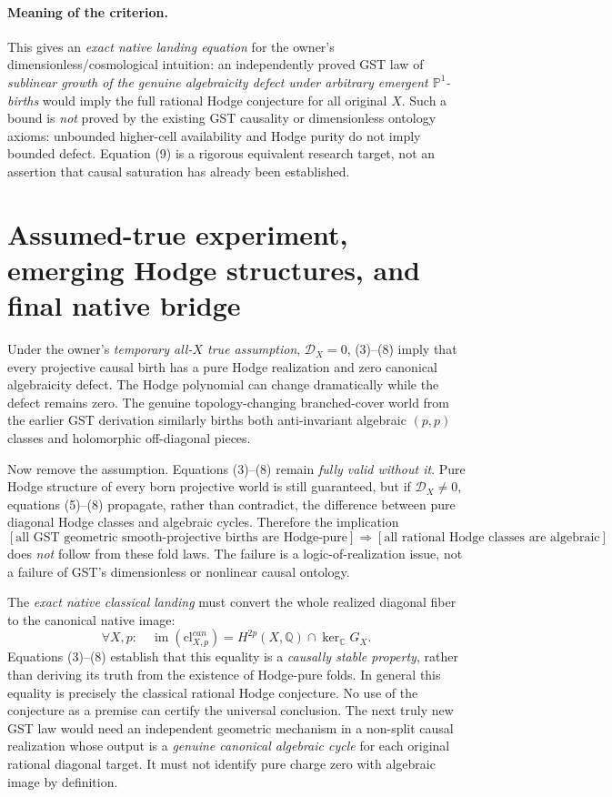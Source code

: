\documentclass[11pt]{article}
\begin{document}
\paragraph{Meaning of the criterion.}
This gives an \emph{exact native landing equation} for the
owner's dimensionless/cosmological intuition: an
independently proved GST law of \emph{sublinear growth
of the genuine algebraicity defect under arbitrary
emergent \(\mathbb P^1\)-births} would imply the
full rational Hodge conjecture for all original \(X\).
Such a bound is \emph{not} proved by the existing
GST causality or dimensionless ontology axioms:
unbounded higher-cell availability and Hodge purity
do not imply bounded defect. Equation (9) is a rigorous
equivalent research target, not an assertion that
causal saturation has already been established.

\section{Assumed-true experiment, emerging Hodge structures, and final native bridge}
Under the owner's \emph{temporary all-\(X\) true assumption},
\(\mathcal D_X=0\), (3)--(8) imply that every projective
causal birth has a pure Hodge realization and zero
canonical algebraicity defect. The Hodge polynomial can
change dramatically while the defect remains zero.
The genuine topology-changing branched-cover world
from the earlier GST derivation similarly births both
anti-invariant algebraic \((p,p)\) classes and holomorphic
off-diagonal pieces.

Now remove the assumption. Equations (3)--(8) remain
\emph{fully valid without it}. Pure Hodge structure of
every born projective world is still guaranteed, but
if \(\mathcal D_X\ne0\), equations (5)--(8) propagate,
rather than contradict, the difference between pure
diagonal Hodge classes and algebraic cycles.
Therefore the implication
\[
  [\text{all GST geometric smooth-projective births are Hodge-pure}]
   \Longrightarrow
  [\text{all rational Hodge classes are algebraic}]
                                                               \tag{9}
\]
does \emph{not} follow from these fold laws. The failure
is a logic-of-realization issue, not a failure of GST's
dimensionless or nonlinear causal ontology.

The \emph{exact native classical landing} must convert
the whole realized diagonal fiber to the canonical
native image:
\[
 \boxed{\forall X,p:\quad
       \operatorname{im}(\mathrm{cl}^{can}_{X,p})=
       H^{2p}(X,\mathbb Q)\cap \ker_{\mathbb C} G_X .}          \tag{10}
\]
Equations (3)--(8) establish that this equality is a
\emph{causally stable property}, rather than deriving
its truth from the existence of Hodge-pure folds.
In general this equality is precisely the classical
rational Hodge conjecture. No use of the conjecture as a
premise can certify the universal conclusion.
The next truly new GST law would need an independent
geometric mechanism in a non-split causal realization
whose output is a \emph{genuine canonical algebraic
cycle} for each original rational diagonal target.
It must not identify pure charge zero with algebraic
image by definition.
\end{document}
